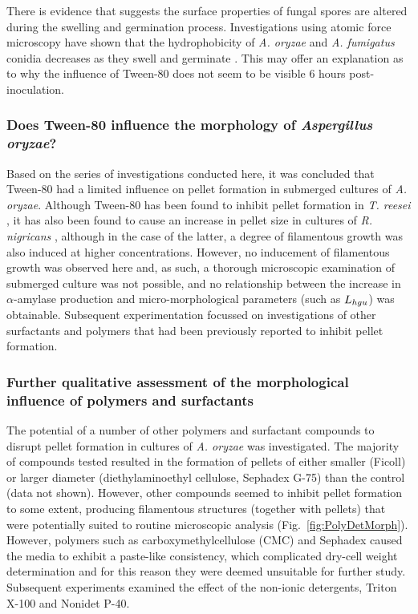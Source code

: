 There is evidence that suggests the surface properties of fungal spores are altered during the swelling and germination process. Investigations using atomic force microscopy have shown that the hydrophobicity of \emph{A. oryzae} and \emph{A. fumigatus} conidia decreases as they swell and germinate \cite{vanderaa2002,dague2008}. This may offer an explanation as to why the influence of Tween-80 does not seem to be visible 6 hours post-inoculation.

\subsubsection{Does Tween-80 influence the morphology of \emph{Aspergillus oryzae}?}

Based on the series of investigations conducted here, it was concluded that Tween-80 had a limited influence on pellet formation in submerged cultures of \emph{A. oryzae}. Although Tween-80 has been found to inhibit pellet formation in \emph{T. reesei} \cite{domingues2000}, it has also been found to cause an increase in pellet size in cultures of \emph{R. nigricans} \cite{znidarsic2000}, although in the case of the latter, a degree of filamentous growth was also induced at higher concentrations. However, no inducement of filamentous growth was observed here and, as such, a thorough microscopic examination of submerged culture was not possible, and no relationship between the increase in $\alpha$-amylase production and micro-morphological parameters (such as $L_{hgu}$) was obtainable. Subsequent experimentation focussed on investigations of other surfactants and polymers that had been previously reported to inhibit pellet formation.

\subsubsection{Further qualitative assessment of the morphological influence of polymers and surfactants}

The potential of a number of other polymers and surfactant compounds to disrupt pellet formation in cultures of \emph{A. oryzae} was investigated. The majority of compounds tested resulted in the formation of pellets of either smaller (Ficoll) or larger diameter (diethylaminoethyl cellulose, Sephadex G-75) than the control (data not shown). However, other compounds seemed to inhibit pellet formation to some extent, producing filamentous structures (together with pellets) that were potentially suited to routine microscopic analysis (Fig.~\ref{fig:PolyDetMorph}). However, polymers such as carboxymethylcellulose (CMC) and Sephadex caused the media to exhibit a paste-like consistency, which complicated dry-cell weight determination and for this reason they were deemed unsuitable for further study. Subsequent experiments examined the effect of the non-ionic detergents, Triton X-100 and Nonidet P-40.

